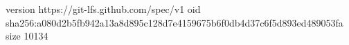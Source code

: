 version https://git-lfs.github.com/spec/v1
oid sha256:a080d2b5fb942a13a8d895c128d7e4159675b6f0db4d37c6f5d893ed489053fa
size 10134
